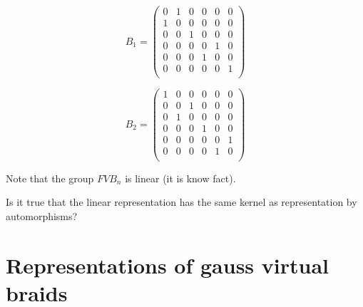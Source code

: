 \documentclass{article}
\begin{document}
\begin{equation*}

B_1 = 

\begin{pmatrix}

0& 1& 0& 0& 0& 0\\

  1& 0& 0& 0& 0& 0\\

  0& 0& 1& 0& 0& 0\\

  0& 0& 0& 0& 1& 0\\

  0& 0& 0& 1& 0& 0\\

  0& 0& 0& 0& 0& 1\\

\end{pmatrix}

\end{equation*}

\begin{equation*}

B_2 = 

\begin{pmatrix}

  1& 0& 0& 0& 0& 0\\

  0& 0& 1& 0& 0& 0\\

  0& 1& 0& 0& 0& 0\\

  0& 0& 0& 1& 0& 0\\

  0& 0& 0& 0& 0& 1\\

  0& 0& 0& 0& 1& 0\\

\end{pmatrix}

\end{equation*}

Note that the group $FVB_n$ is linear (it is know fact).



Is it true that the linear representation has the same kernel as representation by automorphisms?



\section{Representations of gauss virtual braids}
\end{document}
